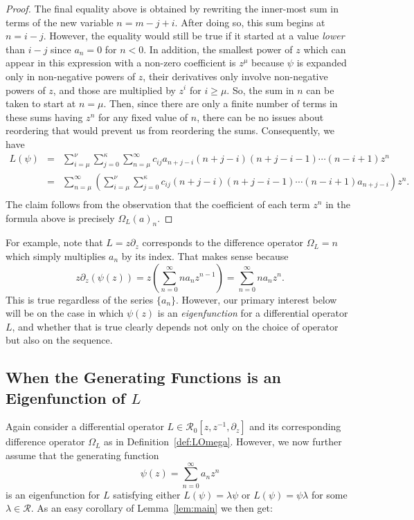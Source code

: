 \documentclass{amsart}
\theoremstyle{definition}
\theoremstyle{remark}
\numberwithin{equation}{section}
\def\R{\mathcal{R}}
\def\zmin{\mu}
\def\zmax{\nu}
\def\dmax{\kappa}
\begin{document}
\begin{proof}
The final equality above is obtained by rewriting the inner-most sum
in terms of the new variable $n=m-j+i$.
After doing so, this sum begins at $n=i-j$.  However, the equality would
still be true if it started at a value \textit{lower} than $i-j$ since
$a_n=0$ for $n<0$.  In addition, the smallest power of $z$ which can
appear in this expression with a non-zero coefficient is $z^{\zmin}$
because $\psi$ is expanded only in non-negative powers of $z$, their
derivatives only involve non-negative powers of $z$, and those are
multiplied by $z^i$ for $i\geq \zmin$.  So, the sum in $n$ can be
taken to start at $n=\zmin$.  Then, since there are only a finite
number of terms in these sums having $z^n$ for any fixed value of $n$,
there can be no issues about reordering that would prevent us from
reordering the sums.
Consequently, we have
\begin{eqnarray*}
L(\psi)& =&\sum_{i=\zmin}^{\zmax}\sum_{j=0}^{\dmax}\sum_{n=\zmin}^\infty c_{ij}a_{n+j-i}
      (n+j-i)(n+j-i-1)\cdots(n-i+1)z^{n}\\
&=&\sum_{n=\zmin}^{\infty}\left(
\sum_{i=\zmin}^{\zmax}\sum_{j=0}^{\dmax} 
c_{ij}(n+j-i)(n+j-i-1)\cdots(n-i+1)a_{n+j-i}\right)z^{n}.\\
\end{eqnarray*}
The claim follows from the observation that the coefficient of each
term $z^n$
in the formula above is precisely $\Omega_L(a)_n$.
\end{proof}

For example, note that $L=z\partial_z$
corresponds to the difference operator $\Omega_L=n$ which simply
multiplies $a_n$ by its index.  That makes sense because
$$
z\partial_z(\psi(z))=z\left(\sum_{n=0}^{\infty} na_nz^{n-1}\right)
=\sum_{n=0}^{\infty}na_n z^{n}.
$$
This is true regardless of the series $\{a_n\}$.
However, our primary interest below will be on the case in which
$\psi(z)$ is an \textit{eigenfunction} for a differential operator
$L$, and whether that is true clearly depends not only on the choice of operator but
also on the sequence.


\subsection{When the Generating Functions is an Eigenfunction of $L$}

Again consider a differential operator $L\in\R_0[z,z^{-1},\partial_z]$
and its corresponding difference operator $\Omega_L$ as in
Definition~\ref{def:LOmega}.  However, we now further assume that the
generating function $$\psi(z)=\sum_{n=0}^{\infty}a_nz^n$$
is an eigenfunction for $L$ satisfying either $L(\psi)=\lambda\psi$ or
$L(\psi)=\psi\lambda$ for some $\lambda\in\R$.
As an easy corollary of Lemma~\ref{lem:main} we then get:
\end{document}
